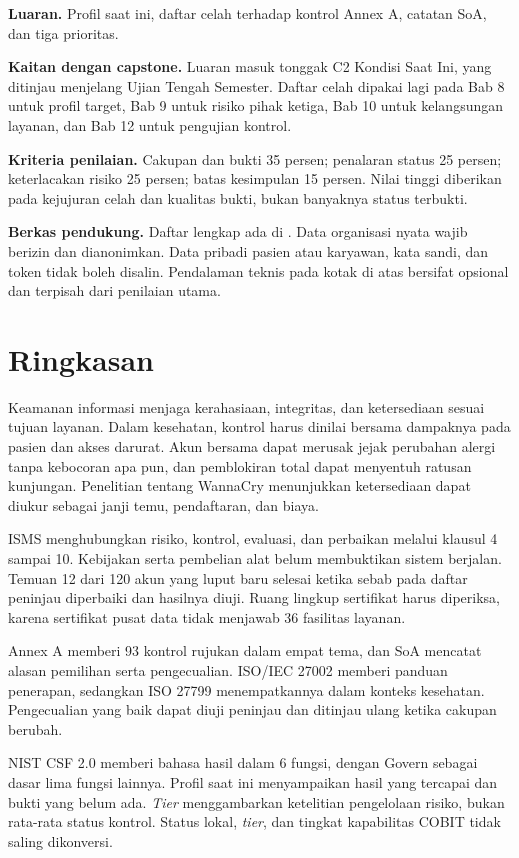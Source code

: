 \textbf{Luaran.} Profil saat ini, daftar celah terhadap kontrol Annex A, catatan SoA, dan tiga
prioritas.

\textbf{Kaitan dengan capstone.} Luaran masuk tonggak C2 Kondisi Saat Ini, yang ditinjau menjelang
Ujian Tengah Semester. Daftar celah dipakai lagi pada Bab 8 untuk profil target, Bab 9 untuk risiko
pihak ketiga, Bab 10 untuk kelangsungan layanan, dan Bab 12 untuk pengujian kontrol.

\textbf{Kriteria penilaian.} Cakupan dan bukti 35 persen; penalaran status 25 persen; keterlacakan
risiko 25 persen; batas kesimpulan 15 persen. Nilai tinggi diberikan pada kejujuran celah dan kualitas
bukti, bukan banyaknya status terbukti.

\textbf{Berkas pendukung.} Daftar lengkap ada di . Data organisasi
nyata wajib berizin dan dianonimkan. Data pribadi pasien atau karyawan, kata sandi, dan token tidak
boleh disalin. Pendalaman teknis pada kotak di atas bersifat opsional dan terpisah dari penilaian
utama.

\section{Ringkasan}

Keamanan informasi menjaga kerahasiaan, integritas, dan ketersediaan sesuai tujuan layanan. Dalam
kesehatan, kontrol harus dinilai bersama dampaknya pada pasien dan akses darurat. Akun bersama dapat
merusak jejak perubahan alergi tanpa kebocoran apa pun, dan pemblokiran total dapat menyentuh ratusan
kunjungan. Penelitian tentang WannaCry menunjukkan ketersediaan dapat diukur sebagai janji temu,
pendaftaran, dan biaya.

ISMS menghubungkan risiko, kontrol, evaluasi, dan perbaikan melalui klausul 4 sampai 10. Kebijakan
serta pembelian alat belum membuktikan sistem berjalan. Temuan 12 dari 120 akun yang luput baru selesai
ketika sebab pada daftar peninjau diperbaiki dan hasilnya diuji. Ruang lingkup sertifikat harus
diperiksa, karena sertifikat pusat data tidak menjawab 36 fasilitas layanan.

Annex A memberi 93 kontrol rujukan dalam empat tema, dan SoA mencatat alasan pemilihan serta
pengecualian. ISO/IEC 27002 memberi panduan penerapan, sedangkan ISO 27799 menempatkannya dalam konteks
kesehatan. Pengecualian yang baik dapat diuji peninjau dan ditinjau ulang ketika cakupan berubah.

NIST CSF 2.0 memberi bahasa hasil dalam 6 fungsi, dengan Govern sebagai dasar lima fungsi lainnya.
Profil saat ini menyampaikan hasil yang tercapai dan bukti yang belum ada. \textit{Tier} menggambarkan
ketelitian pengelolaan risiko, bukan rata-rata status kontrol. Status lokal, \textit{tier}, dan tingkat
kapabilitas COBIT tidak saling dikonversi.

